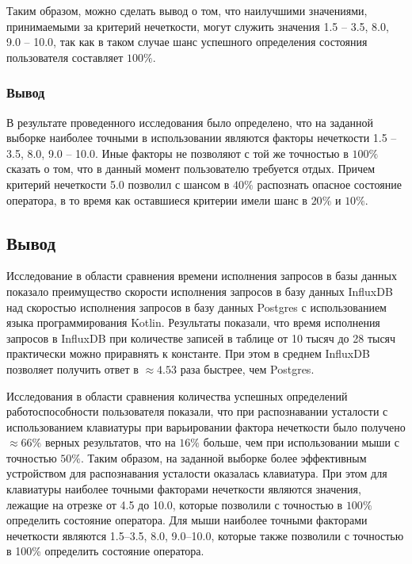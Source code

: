 Таким образом, можно сделать вывод о том, что наилучшими значениями, принимаемыми за критерий нечеткости, могут служить значения 1.5 -- 3.5, 8.0, 9.0 -- 10.0, так как в таком случае шанс успешного определения состояния пользователя составляет $100\%$.

\subsubsection*{Вывод}
В результате проведенного исследования было определено, что на заданной выборке наиболее точными в использовании являются факторы нечеткости 1.5 -- 3.5, 8.0, 9.0 -- 10.0. Иные факторы не позволяют с той же точностью в $100\%$ сказать о том, что в данный момент пользователю требуется отдых. Причем критерий нечеткости 5.0 позволил с шансом в $40\%$ распознать опасное состояние оператора, в то время как оставшиеся критерии имели шанс в $20\%$ и $10\%$.

\subsection*{Вывод}
Исследование в области сравнения времени исполнения запросов в базы данных показало преимущество скорости исполнения запросов в базу данных InfluxDB над скоростью исполнения запросов в базу данных Postgres с использованием языка программирования Kotlin. Результаты показали, что время исполнения запросов в InfluxDB при количестве записей в таблице от 10 тысяч до 28 тысяч практически можно приравнять к константе. При этом в среднем InfluxDB позволяет получить ответ в $\approx 4.53$ раза быстрее, чем Postgres.

Исследования в области сравнения количества успешных определений работоспособности пользователя показали, что при распознавании усталости с использованием клавиатуры при варьировании фактора нечеткости было получено $\approx 66\%$ верных результатов, что на $16\%$ больше, чем при использовании мыши с точностью $50\%$. Таким образом, на заданной выборке более эффективным устройством для распознавания усталости оказалась клавиатура. При этом для клавиатуры наиболее точными факторами нечеткости являются значения, лежащие на отрезке от 4.5 до 10.0, которые позволили с точностью в $100\%$ определить состояние оператора. Для мыши наиболее точными факторами нечеткости являются 1.5--3.5, 8.0, 9.0--10.0, которые также позволили с точностью в 100\% определить состояние оператора.

\pagebreak
